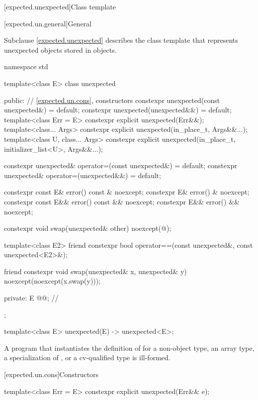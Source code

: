 [expected.unexpected]{Class template }

[expected.un.general]{General}

\pnum
Subclause \ref{expected.unexpected} describes the class template 
that represents unexpected objects stored in  objects.

%
\begin{codeblock}
namespace std {
  template<class E>
  class unexpected {
  public:
    // \ref{expected.un.cons}, constructors
    constexpr unexpected(const unexpected&) = default;
    constexpr unexpected(unexpected&&) = default;
    template<class Err = E>
      constexpr explicit unexpected(Err&&);
    template<class... Args>
      constexpr explicit unexpected(in_place_t, Args&&...);
    template<class U, class... Args>
      constexpr explicit unexpected(in_place_t, initializer_list<U>, Args&&...);

    constexpr unexpected& operator=(const unexpected&) = default;
    constexpr unexpected& operator=(unexpected&&) = default;

    constexpr const E& error() const & noexcept;
    constexpr E& error() & noexcept;
    constexpr const E&& error() const && noexcept;
    constexpr E&& error() && noexcept;

    constexpr void swap(unexpected& other) noexcept(@\seebelow@);

    template<class E2>
      friend constexpr bool operator==(const unexpected&, const unexpected<E2>&);

    friend constexpr void swap(unexpected& x, unexpected& y) noexcept(noexcept(x.swap(y)));

  private:
    E @@;             // \expos
  };

  template<class E> unexpected(E) -> unexpected<E>;
}
\end{codeblock}

\pnum
A program that instantiates the definition of  for
a non-object type,
an array type,
a specialization of , or
a cv-qualified type
is ill-formed.

[expected.un.cons]{Constructors}

%
\begin{itemdecl}
template<class Err = E>
  constexpr explicit unexpected(Err&& e);
\end{itemdecl}

